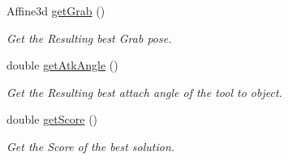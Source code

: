 \begin{DoxyCompactItemize}
Affine3d \hyperlink{classTool__Expt_ad6ca5e51647eee6b267bf51bed8de6a7}{get\+Grab} ()
\begin{DoxyCompactList}\small\item\em Get the Resulting best Grab pose. \end{DoxyCompactList}\item 
double \hyperlink{classTool__Expt_ae29bee730a8bbd7b0a183af404bb366f}{get\+Atk\+Angle} ()
\begin{DoxyCompactList}\small\item\em Get the Resulting best attach angle of the tool to object. \end{DoxyCompactList}\item 
double \hyperlink{classTool__Expt_a1fb8b0a8c2fe25b5e909dcde87b34dd3}{get\+Score} ()
\begin{DoxyCompactList}\small\item\em Get the Score of the best solution. \end{DoxyCompactList}\end{DoxyCompactItemize}
